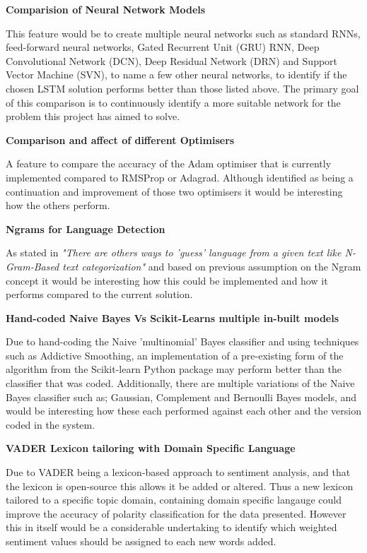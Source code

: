 \documentclass[oneside, 12pt]{article}
\begin{document}
		\textbf{Comparision of Neural Network Models}
		
		This feature would be to create multiple neural networks such as standard RNNs, feed-forward neural networks, Gated Recurrent Unit (GRU) RNN, Deep Convolutional Network (DCN), Deep Residual Network (DRN) and Support Vector Machine (SVN), to name a few other neural networks, to identify if the chosen LSTM solution performs better than those listed above. The primary goal of this comparison is to continuously identify a more suitable network for the problem this project has aimed to solve.
		\newline
		
		\textbf{Comparison and affect of different Optimisers}
		
		A feature to compare the accuracy of the Adam optimiser that is currently implemented compared to RMSProp or Adagrad. Although identified as being a continuation and improvement of those two optimisers it would be interesting how the others perform.
		\newline
		
		\textbf{Ngrams for Language Detection}
		
		As stated in \cite{langdectNLTK} \textit{"There are others ways to 'guess' language from a given text like N-Gram-Based text categorization"} and based on previous assumption on the Ngram concept it would be interesting how this could be implemented and how it performs compared to the current solution.
		\newline
		
		\textbf{Hand-coded Naive Bayes Vs Scikit-Learns multiple in-built models}
		
		Due to hand-coding the Naive 'multinomial' Bayes classifier and using techniques such as Addictive Smoothing, an implementation of a pre-existing form of the algorithm from the Scikit-learn Python package may perform better than the classifier that was coded. Additionally, there are multiple variations of the Naive Bayes classifier such as; Gaussian, Complement and Bernoulli Bayes models, and would be interesting how these each performed against each other and the version coded in the system.
		\newline
		
		\textbf{VADER Lexicon tailoring with Domain Specific Language}
		
		Due to VADER being a lexicon-based approach to sentiment analysis, and that the lexicon is open-source this allows it be added or altered. Thus a new lexicon tailored to a specific topic domain, containing domain specific langauge could improve the accuracy of polarity classification for the data presented. However this in itself would be a considerable undertaking to identify which weighted sentiment values should be assigned to each new words added.
		\newline
		
\end{document}
